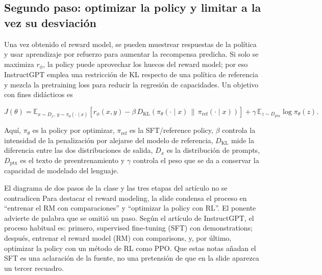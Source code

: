 
\subsection{Segundo paso: optimizar la policy y limitar a la vez su desviación}

Una vez obtenido el reward model, se pueden muestrear respuestas de la política y usar aprendizaje por refuerzo para aumentar la recompensa predicha. Si solo se maximiza $r_\phi$, la policy puede aprovechar los huecos del reward model; por eso InstructGPT emplea una restricción de KL respecto de una política de referencia y mezcla la pretraining loss para reducir la regresión de capacidades. Un objetivo con fines didácticos es

\[
J(\theta)=
\mathbb{E}_{x\sim D_x,\,y\sim\pi_\theta(\cdot\mid x)}
\left[r_\phi(x,y)-\beta\,
D_{\mathrm{KL}}\!\left(\pi_\theta(\cdot\mid x)\,\|\,\pi_{\mathrm{ref}}(\cdot\mid x)\right)\right]
+\gamma\,\mathbb{E}_{z\sim D_{\mathrm{ptx}}}\log \pi_\theta(z).
\]

Aquí, $\pi_\theta$ es la policy por optimizar, $\pi_{\mathrm{ref}}$ es la SFT/reference policy, $\beta$ controla la intensidad de la penalización por alejarse del modelo de referencia, $D_{\mathrm{KL}}$ mide la diferencia entre las dos distribuciones de salida, $D_x$ es la distribución de prompts, $D_{\mathrm{ptx}}$ es el texto de preentrenamiento y $\gamma$ controla el peso que se da a conservar la capacidad de modelado del lenguaje.


\begin{importantbox}{El diagrama de dos pasos de la clase y las tres etapas del artículo no se contradicen}
Para destacar el reward modeling, la slide condensa el proceso en ``entrenar el RM con comparaciones'' y ``optimizar la policy con RL''. El ponente advierte de palabra que se omitió un paso. Según el artículo de InstructGPT, el proceso habitual es: primero, supervised fine-tuning (SFT) con demonstrations; después, entrenar el reward model (RM) con comparisons, y, por último, optimizar la policy con un método de RL como PPO. Que estas notas añadan el SFT es una aclaración de la fuente, no una pretensión de que en la slide aparezca un tercer recuadro.
\end{importantbox}

